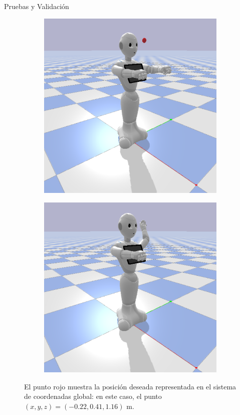 \documentclass[spanish,10pt]{beamer}
\begin{document}
\begin{frame}{Pruebas y Validación}
\begin{figure}[h!]
			\begin{subfigure}[b]{0.4\textwidth}
				\centering
				\includegraphics[width=\textwidth]{images/metodologia/test_start}
			\end{subfigure}
			\hfill
			\begin{subfigure}[b]{0.41\textwidth}
				\centering
				\includegraphics[width=\textwidth]{images/metodologia/test_reached}
			\end{subfigure}
			
			\caption{El punto rojo muestra la posición deseada representada en el sistema de coordenadas global: en este caso, el punto $(x,y,z)=(-0.22, 0.41, 1.16) \text{ m}$.}
		\end{figure}
	\end{frame}
	
\end{document}
